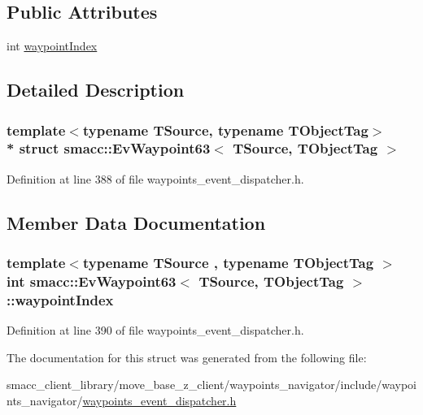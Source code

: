 \subsection*{Public Attributes}
\begin{DoxyCompactItemize}
\item 
int \hyperlink{structsmacc_1_1EvWaypoint63_a1696a3a3768b1aa5269e39774d180abe}{waypoint\+Index}
\end{DoxyCompactItemize}


\subsection{Detailed Description}
\subsubsection*{template$<$typename T\+Source, typename T\+Object\+Tag$>$\\*
struct smacc\+::\+Ev\+Waypoint63$<$ T\+Source, T\+Object\+Tag $>$}



Definition at line 388 of file waypoints\+\_\+event\+\_\+dispatcher.\+h.



\subsection{Member Data Documentation}
\subsubsection[{\texorpdfstring{waypoint\+Index}{waypointIndex}}]{\setlength{\rightskip}{0pt plus 5cm}template$<$typename T\+Source , typename T\+Object\+Tag $>$ int {\bf smacc\+::\+Ev\+Waypoint63}$<$ T\+Source, T\+Object\+Tag $>$\+::waypoint\+Index}\hypertarget{structsmacc_1_1EvWaypoint63_a1696a3a3768b1aa5269e39774d180abe}{}\label{structsmacc_1_1EvWaypoint63_a1696a3a3768b1aa5269e39774d180abe}


Definition at line 390 of file waypoints\+\_\+event\+\_\+dispatcher.\+h.



The documentation for this struct was generated from the following file\+:\begin{DoxyCompactItemize}
\item 
smacc\+\_\+client\+\_\+library/move\+\_\+base\+\_\+z\+\_\+client/waypoints\+\_\+navigator/include/waypoints\+\_\+navigator/\hyperlink{waypoints__event__dispatcher_8h}{waypoints\+\_\+event\+\_\+dispatcher.\+h}\end{DoxyCompactItemize}
